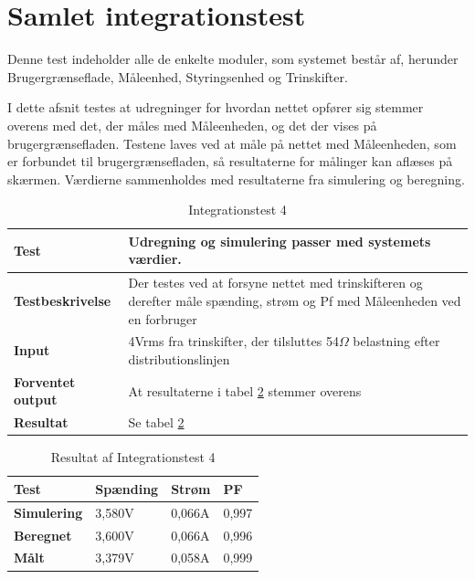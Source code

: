 
\section{Samlet integrationstest}
Denne test indeholder alle de enkelte moduler, som systemet består af, herunder Brugergrænseflade, Måleenhed, Styringsenhed og Trinskifter. 

I dette afsnit testes at udregninger for hvordan nettet opfører sig stemmer overens med det, der måles med Måleenheden, og det der vises på brugergrænsefladen.
Testene laves ved at måle på nettet med Måleenheden, som er forbundet til brugergrænsefladen, så resultaterne for målinger kan aflæses på skærmen. Værdierne sammenholdes med resultaterne fra simulering og beregning. 



\begin{table}[H]
	\begin{tabular}{ | m{} | m{}|} 
		\hline
		\textbf{Test}					&Udregning og simulering passer med systemets værdier. \\ \hline
		\textbf{Testbeskrivelse}		&Der testes ved at forsyne nettet med trinskifteren og derefter måle spænding, strøm og Pf med Måleenheden ved en forbruger \\ \hline
		\textbf{Input}					&4Vrms fra trinskifter, der tilsluttes 54$\Omega$ belastning efter distributionslinjen \\ \hline
		\textbf{Forventet output}		&At resultaterne i tabel \ref{tab:intTest4result} stemmer overens \\ \hline
		\textbf{Resultat}				&Se tabel \ref{tab:intTest4result} \\ \hline
	\end{tabular}
	\caption{Integrationstest 4}
\label{tab:intTest4}
\end{table}


\begin{table}[H]
	\begin{tabular}{ | m{} | m{} | m{} | m{}|}  
		\hline
		\textbf{Test}			& \textbf{Spænding} & \textbf{Strøm}  	& \textbf{PF}			\\ \hline
		\textbf{Simulering}		&3,580V					&0,066A				  	&0,997 					\\ \hline
		\textbf{Beregnet}		&3,600V 					&0,066A					&0,996					\\ \hline
		\textbf{Målt}			&3,379V					&0,058A					&0,999				\\ \hline
	\end{tabular}
	\caption{Resultat af Integrationstest 4}
	\label{tab:intTest4result}
\end{table}

